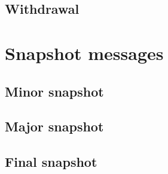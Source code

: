 \documentclass[../hydrozoa.tex]{subfiles}
\begin{document}

\subsection{Withdrawal}%
\label{h:consensus-withdrawal}


\section{Snapshot messages}%
\label{h:consensus-snapshots}

\subsection{Minor snapshot}%
\label{h:consensus-minor-snapshot}



\subsection{Major snapshot}%
\label{h:consensus-major-snapshot}



\subsection{Final snapshot}%
\label{h:consensus-final-snapshot}


\end{document}
